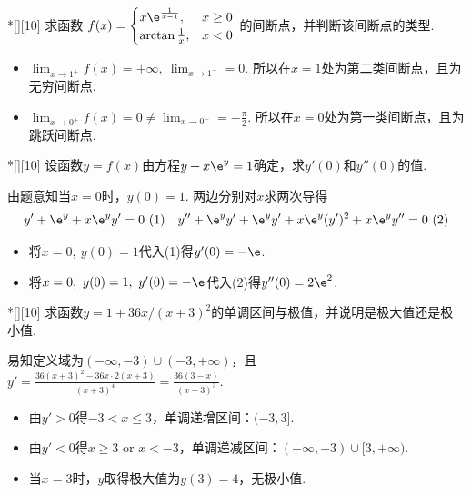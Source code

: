 \begin{problem}*[][10]
    求函数
    $f(x)=\begin{cases}
        x\e^{\frac{1}{x-1}}, &x\geq 0\\
        \arctan\frac1x, &x<0
    \end{cases}$
    的间断点，并判断该间断点的类型.
\end{problem}
\begin{solution}
\begin{itemize}
    \item $\lim_{x\to 1^+}f(x)=+\infty,\ \lim_{x\to 1^-}=0$. 所以在$x=1$处为第二类间断点，且为无穷间断点.
    \item $\lim_{x\to 0^+}f(x)=0\neq\lim_{x\to 0^-}=-\frac\pi2$. 所以在$x=0$处为第一类间断点，且为跳跃间断点.
\end{itemize}
\end{solution}

\begin{problem}*[][10]
    设函数$y=f(x)$由方程$y+x\e^y=1$确定，求$y'(0)$和$y''(0)$的值.
\end{problem}
\begin{solution}
    由题意知当$x=0$时，$y(0)=1$. 两边分别对$x$求两次导得\[y'+\e^y+x\e^yy'=0\ (1)\quad y''+\e^yy'+\e^yy'+x\e^y(y')^2+x\e^yy''=0\ (2)\]
\begin{itemize}
    \item 将$x=0,\ y(0)=1$代入(1)得$y'(0)=-\e$.
    \item 将$x=0,\ y(0)=1,\ y'(0)=-\e$代入(2)得$y''(0)=2\e^2$.
\end{itemize}
\end{solution}

\begin{problem}*[][10]
    求函数$y=1+36x/(x+3)^2$的单调区间与极值，并说明是极大值还是极小值.
\end{problem}
\begin{solution}
    易知定义域为$(-\infty,-3)\cup(-3,+\infty)$，且$y'=\frac{36(x+3)^2-36x\cdot 2(x+3)}{(x+3)^4}=\frac{36(3-x)}{(x+3)^3}$.
\begin{itemize}
    \item 由$y'>0$得$-3<x\leq 3$，单调递增区间：$(-3,3]$.
    \item 由$y'<0$得$x\geq 3\text{ or }x<-3$，单调递减区间：$(-\infty,-3)\cup[3,+\infty)$.
    \item 当$x=3$时，$y$取得极大值为$y(3)=4$，无极小值.
\end{itemize}
\end{solution}

